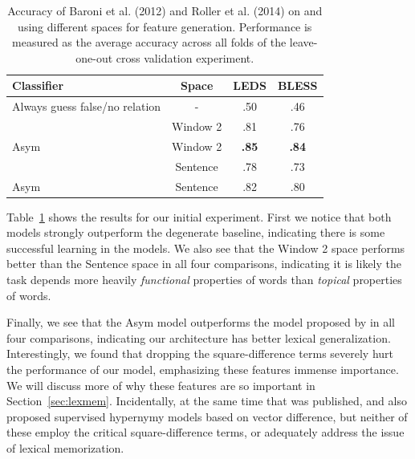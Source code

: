 \documentclass[12pt]{article}
\begin{document}
\begin{table}
  \centering
  \begin{tabular}{|lc|cc|}
    \hline
    {\bf Classifier} & {\bf Space} & {\bf LEDS} & {\bf BLESS}\\
    \hline
    Always guess false/no relation     &   -      & .50          & .46      \\
    \hline
    \cite{baroni:2012:eacl}            & Window 2 & .81          & .76      \\
    Asym \cite{roller:2014:coling}     & Window 2 & {\bf .85}    & {\bf .84}\\
    \cite{baroni:2012:eacl}            & Sentence & .78          & .73      \\
    Asym \cite{roller:2014:coling}     & Sentence & .82          & .80      \\
    \hline
  \end{tabular}
  \caption{Accuracy of Baroni et al. (2012) and Roller et al. (2014) on
  {\bless} and {\entailment}
  using different spaces for feature generation. Performance is measured as
  the average accuracy across all folds of the leave-one-out cross validation
  experiment.}
  \label{tab:asymresults}
\end{table}

Table~\ref{tab:asymresults} shows the results for our initial experiment.
First we notice that both models strongly outperform the degenerate baseline,
indicating there is some successful learning in the models. We also see that
the Window 2 space performs better than the Sentence space in all four
comparisons, indicating it is likely the task depends more heavily {\em
functional} properties of words than {\em topical} properties of words.

Finally, we see that the Asym model outperforms the model proposed by
 in all four comparisons, indicating our architecture
has better lexical generalization.
Interestingly, we found that dropping the square-difference terms
severely hurt the performance of our model, emphasizing these features immense
importance. We will discuss more of why these features are so important in
Section~\ref{sec:lexmem}. Incidentally, at the same time that
 was published,  and
 also proposed supervised hypernymy models based on vector
difference, but neither of these employ the critical square-difference terms,
or adequately address the issue of lexical memorization.
\end{document}
